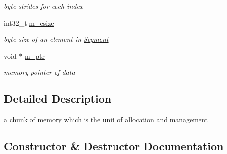 \begin{DoxyCompactItemize}
\begin{DoxyCompactList}\small\item\em byte strides for each index \end{DoxyCompactList}\item 
int32\+\_\+t \hyperlink{struct_s_d_m_t_1_1_segment_abf1844991a9c39778c83fb90bdc95da7}{m\+\_\+esize}\hypertarget{struct_s_d_m_t_1_1_segment_abf1844991a9c39778c83fb90bdc95da7}{}\label{struct_s_d_m_t_1_1_segment_abf1844991a9c39778c83fb90bdc95da7}

\begin{DoxyCompactList}\small\item\em byte size of an element in \hyperlink{struct_s_d_m_t_1_1_segment}{Segment} \end{DoxyCompactList}\item 
void $\ast$ \hyperlink{struct_s_d_m_t_1_1_segment_ad07915cd3d0e07df6338cec28ad077d8}{m\+\_\+ptr}\hypertarget{struct_s_d_m_t_1_1_segment_ad07915cd3d0e07df6338cec28ad077d8}{}\label{struct_s_d_m_t_1_1_segment_ad07915cd3d0e07df6338cec28ad077d8}

\begin{DoxyCompactList}\small\item\em memory pointer of data \end{DoxyCompactList}\end{DoxyCompactItemize}


\subsection{Detailed Description}
a chunk of memory which is the unit of allocation and management 

\subsection{Constructor \& Destructor Documentation}

